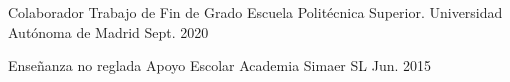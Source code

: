 \begin{cventries}
  \cventry
    {Colaborador} %
    {Trabajo de Fin de Grado} %
    {Escuela Politécnica Superior. Universidad Autónoma de Madrid} %
    {Sept. 2020} %
    {
      \begin{cvitems} %
        \item {}
      \end{cvitems}
    }

  \cventry
    {Enseñanza no reglada} %
    {Apoyo Escolar} %
    {Academia Simaer SL} %
    {Jun. 2015} %
    {}
\end{cventries}

